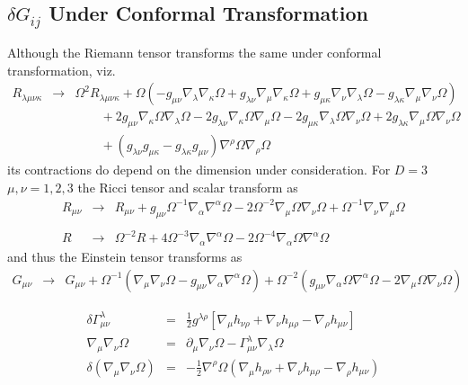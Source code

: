 \documentclass[10pt,letterpaper]{article}
\numberwithin{equation}{section}
\begin{document}
\begin{appendices}
\section{$\delta G_{ij}$ Under Conformal Transformation}
Although the Riemann tensor transforms the same under conformal transformation, viz.
\begin{eqnarray}
R_{\lambda\mu\nu\kappa} &\to& \Omega^2 R_{\lambda\mu\nu\kappa} + \Omega\left ( -g_{\mu\nu}\nabla_\lambda \nabla_\kappa \Omega
+ g_{\lambda\nu}\nabla_\mu\nabla_\kappa \Omega + g_{\mu\kappa} \nabla_\nu\nabla_\lambda \Omega - g_{\lambda\kappa} \nabla_\mu\nabla_\nu \Omega \right)
\nonumber\\
&&\qquad+ 2g_{\mu\nu} \nabla_\kappa\Omega \nabla_\lambda\Omega - 2g_{\lambda\nu} \nabla_\kappa\Omega \nabla_\mu\Omega - 2g_{\mu\kappa}
\nabla_\lambda\Omega \nabla_\nu\Omega + 2g_{\lambda\kappa} \nabla_\mu \Omega \nabla_\nu\Omega
\nonumber\\
&&\qquad + (g_{\lambda\nu} g_{\mu\kappa}-g_{\lambda\kappa}g_{\mu\nu})\nabla^\rho \Omega \nabla_\rho \Omega
\end{eqnarray}
its contractions do depend on the dimension under consideration. For $D=3$ $\mu,\nu = 1,2,3$ the Ricci tensor and scalar transform as
\begin{eqnarray}
R_{\mu\nu} &\to& R_{\mu \nu} +g_{\mu \nu}\Omega^{-1} \nabla_{\alpha}\nabla^{\alpha}\Omega -2 \Omega^{-2}\nabla_{\mu}\Omega \nabla_{\nu}\Omega + \Omega^{-1}\nabla_{\nu}\nabla_{\mu}\Omega
\nonumber\\ \nonumber\\
R &\to& \Omega^{-2}R + 4 \Omega^{-3}\nabla_{\alpha}\nabla^{\alpha}\Omega -  2\Omega^{-4} \nabla_{\alpha}\Omega \nabla^{\alpha}\Omega
\end{eqnarray}
and thus the Einstein tensor transforms as
\begin{eqnarray}
G_{\mu\nu} &\to& G_{\mu\nu} + \Omega^{-1}\left( \nabla_\mu\nabla_\nu \Omega - g_{\mu\nu}\nabla_\alpha\nabla^\alpha\Omega\right)  + \Omega^{-2} \left( g_{\mu\nu} \nabla_\alpha\Omega\nabla^\alpha\Omega -2 \nabla_\mu \Omega\nabla_\nu\Omega\right) 
\label{gbg}
\end{eqnarray}

\begin{eqnarray}
\delta \Gamma^\lambda_{\mu\nu} &=& \tfrac12 g^{\lambda\rho}\left[ \nabla_\mu h_{\nu\rho} + \nabla_\nu h_{\mu\rho} - \nabla_\rho h_{\mu\nu} \right]
\nonumber\\
\nabla_\mu \nabla_\nu \Omega  &=& \partial_\mu \nabla_\nu \Omega  - \Gamma^\lambda_{\mu\nu} \nabla_\lambda\Omega
\nonumber\\
\delta (\nabla_\mu \nabla_\nu \Omega) &=& -\tfrac12 \nabla^\rho \Omega (\nabla_\mu h_{\rho\nu} + \nabla_\nu h_{\mu\rho} - \nabla_\rho h_{\mu\nu})
\end{eqnarray}


\end{appendices}
\end{document}
